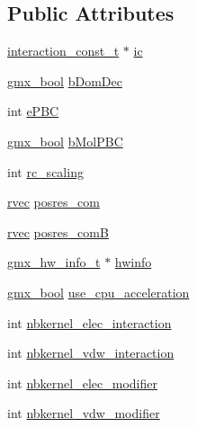\subsection*{\-Public \-Attributes}
\begin{DoxyCompactItemize}
\item 
\hyperlink{structinteraction__const__t}{interaction\-\_\-const\-\_\-t} $\ast$ \hyperlink{structt__forcerec_a542197a5fbe3ac99bca753db021f64d0}{ic}
\item 
\hyperlink{include_2types_2simple_8h_a8fddad319f226e856400d190198d5151}{gmx\-\_\-bool} \hyperlink{structt__forcerec_a8b4bacee398be1804f28a76b55b26b43}{b\-Dom\-Dec}
\item 
int \hyperlink{structt__forcerec_ac644f3b0f5e2b47d5394afbc591b1946}{e\-P\-B\-C}
\item 
\hyperlink{include_2types_2simple_8h_a8fddad319f226e856400d190198d5151}{gmx\-\_\-bool} \hyperlink{structt__forcerec_aa52ef9e2383675f0522a7c74a4106a9e}{b\-Mol\-P\-B\-C}
\item 
int \hyperlink{structt__forcerec_a2d5e5c5f1c734c48ddf1eb0305373029}{rc\-\_\-scaling}
\item 
\hyperlink{share_2template_2gromacs_2types_2simple_8h_aa02a552a4abd2f180c282a083dc3a999}{rvec} \hyperlink{structt__forcerec_a23766abc77f8b08482ae5cf6481348eb}{posres\-\_\-com}
\item 
\hyperlink{share_2template_2gromacs_2types_2simple_8h_aa02a552a4abd2f180c282a083dc3a999}{rvec} \hyperlink{structt__forcerec_a73cc3c330c614744fde473b2c48cb832}{posres\-\_\-com\-B}
\item 
\hyperlink{structgmx__hw__info__t}{gmx\-\_\-hw\-\_\-info\-\_\-t} $\ast$ \hyperlink{structt__forcerec_a2f01da2c90cfa0efa678737f9bc86451}{hwinfo}
\item 
\hyperlink{include_2types_2simple_8h_a8fddad319f226e856400d190198d5151}{gmx\-\_\-bool} \hyperlink{structt__forcerec_a6008acef1f359e0e328f10bca748ebf0}{use\-\_\-cpu\-\_\-acceleration}
\item 
int \hyperlink{structt__forcerec_afdb1ceca13dff235ec9226e15adb98fe}{nbkernel\-\_\-elec\-\_\-interaction}
\item 
int \hyperlink{structt__forcerec_aa12270a7200e94409b8d3aafaf334c4e}{nbkernel\-\_\-vdw\-\_\-interaction}
\item 
int \hyperlink{structt__forcerec_ab5329929139f95626c73374a52d067fe}{nbkernel\-\_\-elec\-\_\-modifier}
\item 
int \hyperlink{structt__forcerec_a554295e5d93aede7b1683fd9ca970588}{nbkernel\-\_\-vdw\-\_\-modifier}

\end{DoxyCompactItemize}

